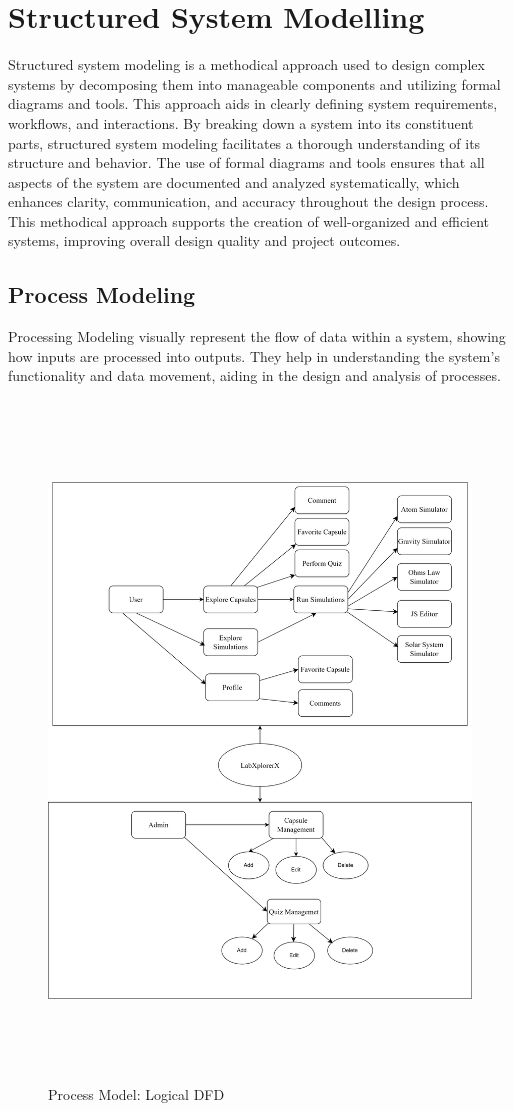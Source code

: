\section{Structured System Modelling }
Structured system modeling is a methodical approach used to design complex systems by decomposing them into manageable components and utilizing formal diagrams and tools. This approach aids in clearly defining system requirements, workflows, and interactions. By breaking down a system into its constituent parts, structured system modeling facilitates a thorough understanding of its structure and behavior. The use of formal diagrams and tools ensures that all aspects of the system are documented and analyzed systematically, which enhances clarity, communication, and accuracy throughout the design process. This methodical approach supports the creation of well-organized and efficient systems, improving overall design quality and project outcomes.
\newpage
\subsection{Process Modeling}
Processing Modeling visually represent the flow of data within a system, showing how inputs are processed into outputs. They help in understanding the system's functionality and data movement, aiding in the design and analysis of processes.
\begin{figure}[H]
    \centering
        \includegraphics[height = 18cm]{Diagrams/ProcessModelling.png}
    \caption{Process Model: Logical DFD}
\end{figure}
\newpage
\newpage
